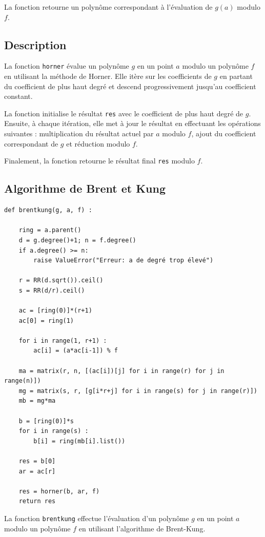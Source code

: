 \documentclass[a4paper]{article}
\begin{document}
La fonction retourne un polynôme correspondant à l'évaluation de $g(a)$ modulo $f$.

\subsection*{Description}

La fonction \texttt{horner} évalue un polynôme $g$ en un point $a$ modulo un polynôme $f$ en utilisant la méthode de Horner. Elle itère sur les coefficients de $g$ en partant du coefficient de plus haut degré et descend progressivement jusqu'au coefficient constant.

La fonction initialise le résultat \texttt{res} avec le coefficient de plus haut degré de $g$. Ensuite, à chaque itération, elle met à jour le résultat en effectuant les opérations suivantes : multiplication du résultat actuel par $a$ modulo $f$, ajout du coefficient correspondant de $g$ et réduction modulo $f$.

Finalement, la fonction retourne le résultat final \texttt{res} modulo $f$.


\subsection{Algorithme de Brent et Kung}

\begin{lstlisting}[frame=leftline, title={brent and kung}]
def brentkung(g, a, f) :

	ring = a.parent()
	d = g.degree()+1; n = f.degree()
	if a.degree() >= n:
		raise ValueError("Erreur: a de degré trop élevé")

	r = RR(d.sqrt()).ceil()
	s = RR(d/r).ceil()

	ac = [ring(0)]*(r+1)
	ac[0] = ring(1)

	for i in range(1, r+1) :
		ac[i] = (a*ac[i-1]) % f

	ma = matrix(r, n, [(ac[i])[j] for i in range(r) for j in range(n)])
	mg = matrix(s, r, [g[i*r+j] for i in range(s) for j in range(r)])
	mb = mg*ma

	b = [ring(0)]*s
	for i in range(s) :
		b[i] = ring(mb[i].list())

	res = b[0]
	ar = ac[r]

	res = horner(b, ar, f)
	return res
\end{lstlisting}
La fonction \texttt{brentkung} effectue l'évaluation d'un polynôme $g$ en un point $a$ modulo un polynôme $f$ en utilisant l'algorithme de Brent-Kung.
\end{document}
